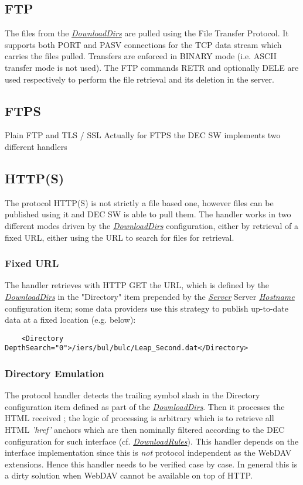 \documentclass[dec_sum_main.tex]{subfiles}
\begin{document}
\subsection{FTP}
The files from the \hyperref[DownloadDirs]{\textit{DownloadDirs}} are 
pulled using the File Transfer Protocol. It supports both PORT and PASV connections for the TCP data stream which carries the files pulled. Transfers are enforced in BINARY mode (i.e. ASCII transfer mode is not used). The FTP commands RETR and optionally DELE are used respectively to perform the file retrieval and its deletion in the server.

\subsection{FTPS}
Plain FTP and TLS / SSL Actually for FTPS the DEC SW implements two different handlers

\subsection{HTTP(S)}
The protocol HTTP(S) is not strictly a file based one, however files can be published using it and DEC SW is able to pull them. The handler works in two different modes driven by the \hyperref[DownloadDirs]{\textit{DownloadDirs}} configuration, either by retrieval of a fixed URL, either using the URL to search for files for retrieval.

\subsubsection{Fixed URL}
The handler retrieves with HTTP GET the URL, which is defined by the \hyperref[DownloadDirs]{\textit{DownloadDirs}} in the "Directory" item prepended by the \hyperref[Config_Server]{\textit{Server}} Server \hyperref[Hostname]{\textit{Hostname}} configuration item; some data providers use this strategy to publish up-to-date data at a fixed location (e.g. below):

\begin{Verbatim}
	<Directory DepthSearch="0">/iers/bul/bulc/Leap_Second.dat</Directory>
\end{Verbatim}

\subsubsection{Directory Emulation}
The protocol handler detects the trailing symbol slash in the Directory configuration item defined as part of the \hyperref[DownloadDirs]{\textit{DownloadDirs}}. Then it processes the HTML received ; the logic of processing is arbitrary which is to retrieve all HTML \textit{'href'} anchors which are then nominally filtered according to the DEC configuration for such interface (cf. \hyperref[DownloadRules]{\textit{DownloadRules}}).
This handler depends on the interface implementation since this is \textit{not} protocol independent as the WebDAV extensions. Hence this handler needs to be verified case by case. In general this is a dirty solution when WebDAV cannot be available on top of HTTP.
\end{document}
